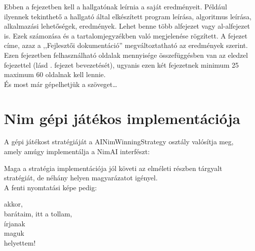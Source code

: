 \label{Chap:dokumen}

Ebben a fejezetben kell a hallgatónak leírnia a saját eredményeit. Például ilyennek tekinthető a hallgató által elkészített program leírása, algoritmus leírása, alkalmazási lehetőségek, eredmények. Lehet benne több alfejezet vagy al-alfejezet is. Ezek számozása és a tartalomjegyzékben való megjelenése rögzített. A fejezet címe, azaz a ,,Fejlesztői dokumentáció'' megváltoztatható az eredmények szerint. Ezen fejezetben felhasználható oldalak mennyisége összefüggésben van az eledzel fejezettel (lásd . fejezet bevezetését), ugyanis ezen két fejezetnek minimum 25 maximum 60 oldalnak kell lennie.\\

És most már gépelhetjük a szöveget\ldots
\section{Nim gépi játékos implementációja}
A gépi játékost stratégiáját a AINimWinningStrategy osztály valósítja meg, amely amúgy implementálja a NimAI interfészt:

Maga a stratégia implementációja jól követi az elméleti részben tárgyalt stratégiát, de néhány helyen magyarázatot igényel. \\



A fenti nyomtatási képe pedig:
\begin{tabbing}
akkor,\= \\
      \>barátaim, itt a tollam,\\
írjanak\= \\
       \>maguk\= \\
       \>     \>helyettem!
\end{tabbing}

